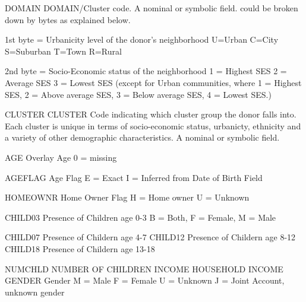 \documentclass[
  11pt,
  a4paper,
  DIV=12,captions=tableheading,oneside,titlepage]{scrbook}
\let\oldverbatim\verbatim
\let\endoldverbatim\endverbatim
\renewenvironment{verbatim}{\footnotesize\oldverbatim}{\endoldverbatim}
\begin{document}
\begin{verbatim}
DOMAIN                      DOMAIN/Cluster code. A nominal or symbolic field. 
                            could be broken down by bytes as explained below.  
                           
                            1st byte = Urbanicity level of the donor's neighborhood
                              U=Urban
                              C=City
                              S=Suburban
                              T=Town
                              R=Rural
                           
                            2nd byte = Socio-Economic status of the neighborhood
                              1 = Highest SES
                              2 = Average SES
                              3 = Lowest SES (except for Urban communities, where 
                                  1 = Highest SES, 2 = Above average SES, 
                                  3 = Below average SES, 4 = Lowest SES.) 
                           
CLUSTER                     CLUSTER
                            Code indicating which cluster group the donor falls into.  
                            Each cluster is unique in terms of socio-economic status, 
                            urbanicty, ethnicity and a variety of other demographic 
                            characteristics. A nominal or symbolic field.
                           
AGE                         Overlay Age 
                            0 = missing
                           
AGEFLAG                     Age Flag
                            E = Exact
                            I = Inferred from Date of Birth Field
                           
HOMEOWNR                    Home Owner Flag
                            H = Home owner 
                            U = Unknown
                           
CHILD03                     Presence of Children age 0-3
                            B = Both, F = Female, M = Male
                           
CHILD07                     Presence of Childern age 4-7
CHILD12                     Presence of Childern age 8-12
CHILD18                     Presence of Childern age 13-18
                           
NUMCHLD                     NUMBER OF CHILDREN
INCOME                      HOUSEHOLD INCOME
GENDER                      Gender
                            M = Male
                            F = Female
                            U = Unknown
                            J = Joint Account, unknown gender
                           

\end{verbatim}
\end{document}
